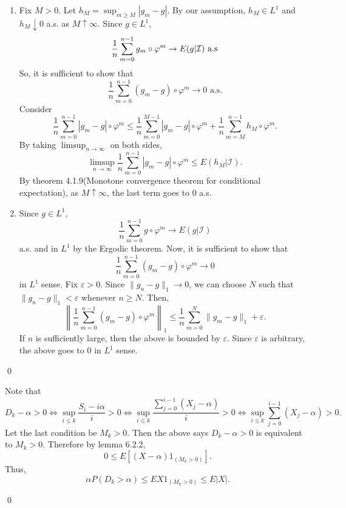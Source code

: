 \begin{problem}[6.2.2] \hfill

	\begin{enumerate}
		\item Fix $M>0$.
			Let $h_M = \sup_{m \ge M} |g_m - g|$.
			By our assumption, $h_M \in L^1$ and $h_M \downarrow 0$ a.s. as $M \uparrow \infty$.
			Since $g\in L^1$,
			\[
				{1 \over n}\sum_{m=0}^{n-1}g_m\circ\varphi^m \rightarrow E(g \lvert \mathcal{I})\text{ a.s}
			\]
			So, it is sufficient to show that
			\[
				\frac{1}{n}\sum_{m=0}^{n-1}(g_m-g)\circ\varphi^m \rightarrow 0 \text{ a.s.}
			\]
			Consider
			\[
				\frac{1}{n}\sum_{m=0}^{n-1}|g_m - g|\circ\varphi^m
				\le \frac{1}{n}\sum_{m=0}^{M-1}|g_m - g|\circ\varphi^m
				+ \frac{1}{n}\sum_{m=M}^{n-1}h_M \circ \varphi^m.
			\]
			By taking $\limsup_{n\rightarrow \infty}$ on both sides,
			\[
				\limsup_{n\rightarrow \infty}\frac{1}{n}\sum_{m=0}^{n-1}|g_m-g|\circ\varphi^m
				\le E(h_M \lvert \mathcal{I}).
			\]
			By theorem 4.1.9(Monotone convergence theorem for conditional expectation),
			as $M \uparrow \infty$, the last term goes to $0$ a.s.

		\item Since $g \in L^1$,
			\[
				\frac{1}{n}\sum_{m=0}^{n-1}g\circ\varphi^m \rightarrow  E(g\lvert \mathcal{I})
			\]
			a.s. and in $L^1$ by the Ergodic theorem.
			Now, it is sufficient to show that
			\[
				\frac{1}{n}\sum_{m=0}^{n-1}(g_m - g)\circ \varphi^m \rightarrow 0
			\]
			in $L^1$ sense.
			Fix $\varepsilon>0$.
			Since $\| g_n -g \|_1 \rightarrow 0$, we can choose $N$ such that
			$\| g_n - g \|_1 < \varepsilon$ whenever $n \ge N$.
			Then,
			\[
				\left \| \frac{1}{n}\sum_{m=0}^{n-1}(g_m - g)\circ \varphi^m \right \|_1 \le 
				\frac{1}{n}\sum_{m=0}^N \| g_m - g \|_1 + \varepsilon.
			\]
			If $n$ is sufficiently large, then the above is bounded by $\varepsilon$.
			Since $\varepsilon$ is arbitrary, the above goes to $0$ in $L^1$ sense.
	\end{enumerate}

	\qed
\end{problem}

\begin{problem}[6.2.3] \hfill

	Note that
	\[
		D_k - \alpha > 0
		\Leftrightarrow \sup_{i\le k}\frac{S_i -i\alpha}{i} > 0
		\Leftrightarrow \sup_{i\le k}\frac{\sum_{j=0}^{i-1}(X_j - \alpha)}{i} >0
		\Leftrightarrow \sup_{i\le k}\sum_{j=0}^{i-1}(X_j -\alpha) >0.
	\]
	Let the last condition be $M_k > 0$.
	Then the above says $D_k - \alpha > 0$ is equivalent to $M_k >0$.
	Therefore by lemma 6.2.2,
	\[
		0 \le E\left[ (X-\alpha)1_{\left( M_k >0 \right)} \right].
	\]
	Thus,
	\[
		\alpha P(D_k > \alpha) \le EX1_{(M_k>0)} \le E|X|.
	\]

	\qed
\end{problem}
